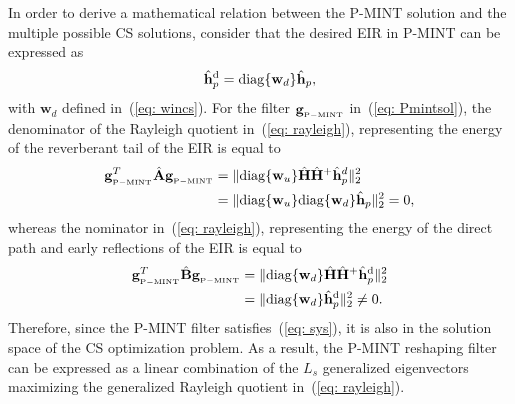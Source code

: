 \documentclass[10pt]{IEEEtran}
\DeclareMathOperator{\diag}{diag}
\begin{document}
In order to derive a mathematical relation between the P-MINT solution and the multiple possible CS solutions, consider that the desired EIR in P-MINT can be expressed as
\begin{equation}
\hat{\mathbf{h}}_p^{\rm d} = {\diag}\{\mathbf{w}_d \}\hat{\mathbf{h}}_p,
\end{equation}
with $\mathbf{w}_d$ defined in~(\ref{eq: wincs}).
For the filter $\mathbf{g}_{{}_{\rm P-MINT}}$ in~(\ref{eq: Pmintsol}), the denominator of the Rayleigh quotient in~(\ref{eq: rayleigh}), representing the energy of the reverberant tail of the EIR is equal to
\begin{align}
\mathbf{g}_{{}_{\rm P-MINT}}^T \hat{\mathbf{A}} \mathbf{g}_{{}_{\rm P-MINT}} &= \|{\diag}\{\mathbf{w}_{u}\}\hat{\mathbf{H}} \hat{\mathbf{H}}^+\hat{\mathbf{h}}_p^d \|_2^2 \\
& =  \|{\diag}\{\mathbf{w}_{u}\} {\diag} \{\mathbf{w}_d \} \hat{\mathbf{h}}_p\|_2^2 = 0,
\end{align}
whereas the nominator in~(\ref{eq: rayleigh}), representing the energy of the direct path and early reflections of the EIR is equal to
\begin{align}
\mathbf{g}_{{}_{\rm P-MINT}}^T \hat{\mathbf{B}} \mathbf{g}_{{}_{\rm P-MINT}} & = \|{\diag}\{\mathbf{w}_{d}\}\hat{\mathbf{H}} \hat{\mathbf{H}}^+\hat{\mathbf{h}}_p^{\rm d} \|_2^2 \\
& =  \|{\diag}\{\mathbf{w}_{d}\} \hat{\mathbf{h}}_p^{\rm d} \|_2^2 \neq 0.
\end{align}
Therefore, since the P-MINT filter satisfies~(\ref{eq: sys}), it is also in the solution space of the CS optimization problem.
As a result, the P-MINT reshaping filter can be expressed as a linear combination of the $L_s$ generalized eigenvectors maximizing the generalized Rayleigh quotient in~(\ref{eq: rayleigh}).
\end{document}
